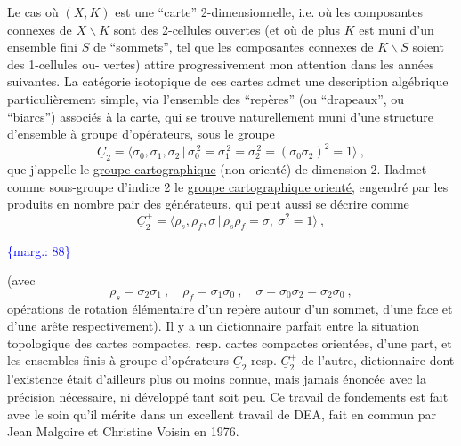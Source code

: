 \documentclass[11pt]{article}
\newcommand{\scanpage}[1]{\par\bigskip\noindent{\small\sffamily[scan #1]}\par}
\newcommand{\mspage}[1]{{\small\sffamily[p.\,#1]}}
\newcommand{\margin}[1]{\textcolor{blue}{\{\textsf{marg.:} #1\}}}
\newcommand{\uline}[1]{\underline{#1}}
\begin{document}
Le cas où $(X,K)$ est une ``carte'' 2-dimensionnelle, i.e.
où les composantes connexes de $X\backslash K$ sont des 2-cellules ouvertes
(et où de plus $K$ est muni d'un ensemble fini $S$ de ``sommets'',
tel que les composantes connexes de $K\backslash S$ soient des 1-cellules ou-%
vertes) attire progressivement mon attention dans les années suivantes.
La catégorie isotopique de ces cartes admet une description algébrique
particulièrement simple, via l'ensemble des ``repères'' (ou ``drapeaux'',
ou ``biarcs'') associés à la carte, qui se trouve naturellement muni
d'une structure d'ensemble à groupe d'opérateurs, sous le groupe
\[ \underline{C}_2 = \langle \sigma_0,\sigma_1,\sigma_2 \,|\, \sigma_0^{\,2} = \sigma_1^{\,2} = \sigma_2^{\,2} = (\sigma_0\sigma_2)^2 = 1 \rangle \ , \]
que j'appelle le \uline{groupe cartographique} (non orienté) de dimension 2.
Iladmet comme sous-groupe d'indice 2 le \uline{groupe cartographique orienté},
engendré par les produits en nombre pair des générateurs, qui peut
aussi se décrire comme
\[ \underline{C}_2^{+} = \langle \rho_s,\rho_f,\sigma \,|\, \rho_s\rho_f = \sigma,\ \sigma^2 = 1 \rangle \ , \]

\margin{88}

\clearpage
\scanpage{119/89}
\mspage{11}

(avec
\[ \rho_s = \sigma_2\sigma_1 \ , \quad \rho_f = \sigma_1\sigma_0 \ , \quad \sigma = \sigma_0\sigma_2 = \sigma_2\sigma_0 \ , \]
opérations de \uline{rotation élémentaire} d'un repère autour d'un sommet,
d'une face et d'une arête respectivement). Il y a un dictionnaire
parfait entre la situation topologique des cartes compactes, resp.
cartes compactes orientées, d'une part, et les ensembles finis à
groupe d'opérateurs $\underline{C}_2$ resp. $\underline{C}_2^+$ de l'autre, dictionnaire dont
l'existence était d'ailleurs plus ou moins connue, mais jamais
énoncée avec la précision nécessaire, ni développé tant soit peu.
Ce travail de fondements est fait avec le soin qu'il mérite dans
un excellent travail de DEA, fait en commun par Jean Malgoire et
Christine Voisin en 1976.
\end{document}
